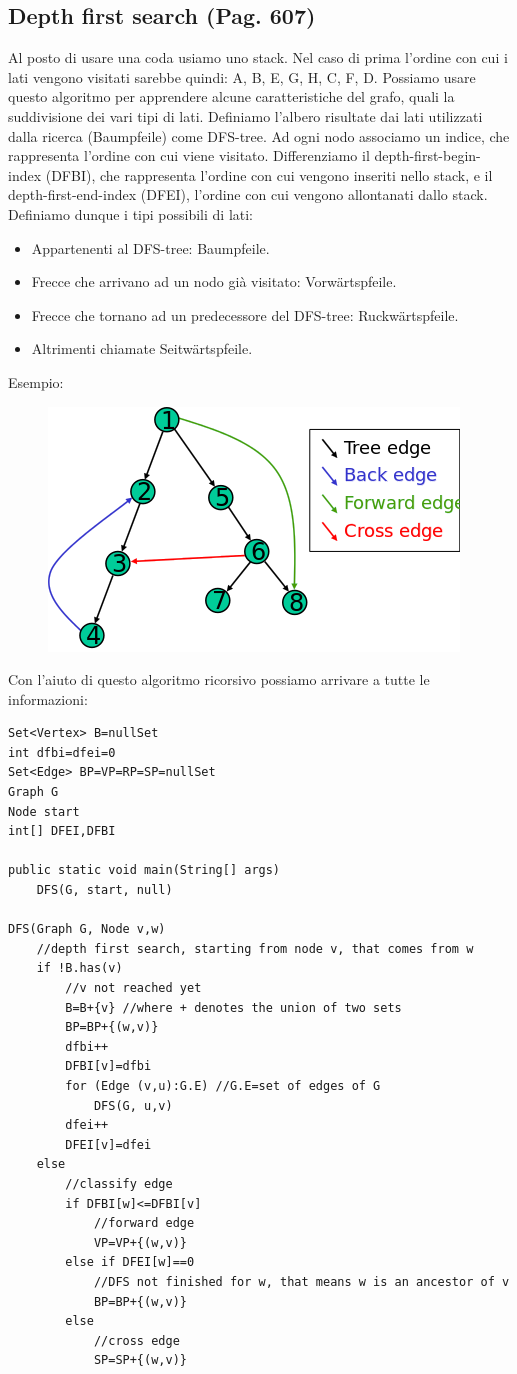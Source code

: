 \documentclass[a4paper]{book}
\newcommand{\lstIndent}{4}
\begin{document}
\subsection{Depth first search (Pag. 607)}
Al posto di usare una coda usiamo uno stack. Nel caso di prima l'ordine con cui i lati vengono visitati sarebbe quindi: A, B, E, G, H, C, F, D. Possiamo usare questo algoritmo per apprendere alcune caratteristiche del grafo, quali la suddivisione dei vari tipi di lati. Definiamo l'albero risultate dai lati utilizzati dalla ricerca (Baumpfeile) come DFS-tree. Ad ogni nodo associamo un indice, che rappresenta l'ordine con cui viene visitato. Differenziamo il depth-first-begin-index (DFBI), che rappresenta l'ordine con cui vengono inseriti nello stack, e il depth-first-end-index (DFEI), l'ordine con cui vengono allontanati dallo stack. Definiamo dunque i tipi possibili di lati:
\begin{itemize}
\item Appartenenti al DFS-tree: Baumpfeile.
\item Frecce che arrivano ad un nodo già visitato: Vorwärtspfeile.
\item Frecce che tornano ad un predecessore del DFS-tree: Ruckwärtspfeile.
\item Altrimenti chiamate Seitwärtspfeile.
\end{itemize}
Esempio:
\begin{figure}[H]
\centering
\includegraphics[scale=0.7]{Figures/edgetype.png}
\end{figure}
Con l'aiuto di questo algoritmo ricorsivo possiamo arrivare a tutte le informazioni:
\begin{lstlisting}[tabsize=\lstIndent]
Set<Vertex> B=nullSet
int dfbi=dfei=0
Set<Edge> BP=VP=RP=SP=nullSet
Graph G
Node start
int[] DFEI,DFBI

public static void main(String[] args)
	DFS(G, start, null)

DFS(Graph G, Node v,w)
	//depth first search, starting from node v, that comes from w
	if !B.has(v)
		//v not reached yet
		B=B+{v} //where + denotes the union of two sets
		BP=BP+{(w,v)}
		dfbi++
		DFBI[v]=dfbi
		for (Edge (v,u):G.E) //G.E=set of edges of G
			DFS(G, u,v)
		dfei++
		DFEI[v]=dfei
	else
		//classify edge
		if DFBI[w]<=DFBI[v]
			//forward edge
			VP=VP+{(w,v)}
		else if DFEI[w]==0 
			//DFS not finished for w, that means w is an ancestor of v
			BP=BP+{(w,v)}
		else
			//cross edge
			SP=SP+{(w,v)}			
\end{lstlisting}
\end{document}

